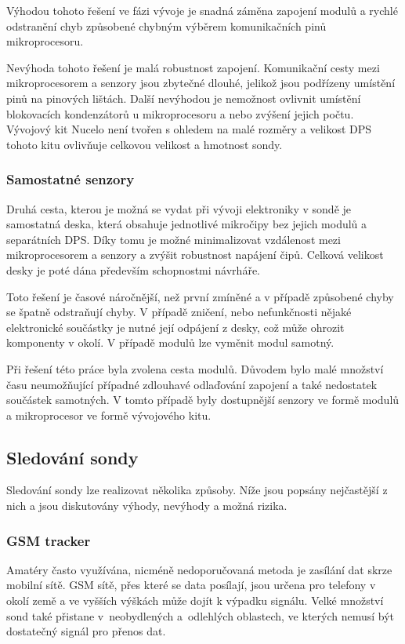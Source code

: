 \documentclass[twoside]{ctuthesis}
\theoremstyle{plain}
\theoremstyle{definition}
\theoremstyle{note}
\begin{document}
			Výhodou tohoto řešení ve fázi vývoje je snadná záměna zapojení modulů a rychlé odstranění chyb způsobené chybným výběrem komunikačních pinů mikroprocesoru.

			Nevýhoda tohoto řešení je malá robustnost zapojení. Komunikační cesty mezi mikroprocesorem a senzory jsou zbytečné dlouhé, jelikož jsou podřízeny umístění pinů na pinových lištách. Další nevýhodou je nemožnost ovlivnit umístění blokovacích kondenzátorů u mikroprocesoru a nebo zvýšení jejich počtu. Vývojový kit Nucelo není tvořen s ohledem na malé rozměry a velikost DPS tohoto kitu ovlivňuje celkovou velikost a hmotnost sondy.

			\subsubsection{Samostatné senzory}
			Druhá cesta, kterou je možná se vydat při vývoji elektroniky v sondě je samostatná deska, která obsahuje jednotlivé mikročipy bez jejich modulů a separátních DPS. Díky tomu je možné minimalizovat vzdálenost mezi mikroprocesorem a senzory a zvýšit robustnost napájení čipů. Celková velikost desky je poté dána především schopnostmi návrháře. 

			Toto řešení je časové náročnější, než první zmíněné a v případě způsobené chyby se špatně odstraňují chyby. V případě zničení, nebo nefunkčnosti nějaké elektronické součástky je nutné její odpájení z desky, což může ohrozit komponenty v okolí. V případě modulů lze vyměnit modul samotný.

			Při řešení této práce byla zvolena cesta modulů. Důvodem bylo malé množství času neumožňující případné zdlouhavé odlaďování zapojení a také nedostatek součástek samotných. V tomto případě byly dostupnější senzory ve formě modulů a mikroprocesor ve formě vývojového kitu. 

			
		\subsection{Sledování sondy}
		Sledování sondy lze realizovat několika způsoby. Níže jsou popsány nejčastější z nich a jsou diskutovány výhody, nevýhody a možná rizika.

				\subsubsection{GSM tracker}
				Amatéry často využívána, nicméně nedoporučovaná metoda \cite{web_sledovani} je zasílání dat skrze mobilní sítě. GSM sítě, přes které se data posílají, jsou určena pro telefony v okolí země a ve vyšších výškách může dojít k výpadku signálu. Velké množství sond také přistane v~neobydlených a~odlehlých oblastech, ve kterých nemusí být dostatečný signál pro přenos dat.
\end{document}
